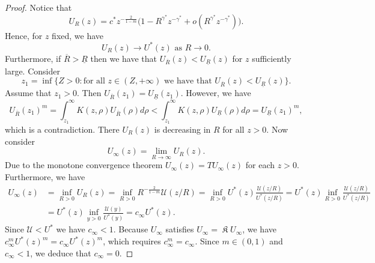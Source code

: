 \documentclass[a4paper]{article}
\theoremstyle{definition}
\DeclareMathOperator{\fixedpoint}{\mathfrak K}
\begin{document}
\begin{proof}
Notice that
\[
  U_R(z) = c^*z^{-\frac 2{1-m}}\Big(1 - R^{\gamma^*} z^{-\gamma^*} + o\left(R^{\gamma^*} z^{-\gamma^*}\right)\Big).
\]
Hence, for $z$ fixed, we have
\[
  U_R(z) \to U^*(z) \text{ as } R \to 0.
\]
Furthermore, if $\overline R > \underline R$ then we have that
$U_{\overline R}(z) < U_{\underline R}(z)$ for $z$ sufficiently large. Consider
\begin{equation*}
  z_1 = \inf\{Z > 0 : \text{for all } z \in (Z,+\infty) \text{ we have that } U_{\overline R}(z) < U_{\underline R}(z)\}.
\end{equation*}
Assume that $z_1 > 0$. Then $U_{\overline R}(z_1) = U_{\underline R}(z_1)$. However, we have
\[
  U_{\overline R}(z_1)^m  = \int_{z_1}^\infty K(z,\rho) U_{\overline R}(\rho) d\rho < \int_{z_1}^\infty K(z,\rho) U_{\underline R}(\rho) d\rho = U_{\underline R} (z_1)^m ,
\]
which is a contradiction. There $U_R(z)$ is decreasing in $R$ for all $z>0$. Now consider
\[
  U_\infty(z) = \lim_{R \to \infty} U_R (z).
\]
Due to the monotone convergence theorem $U_\infty(z) = T U_\infty(z)$ for each $z > 0$. Furthermore, we have
\begin{align*}
  U_\infty(z) & = \inf_{R > 0} U_R(z) = \inf_{R>0} R^{-\frac{2}{1-m}} \mathcal U(z/R) =  \inf_{R>0} U^*(z) \frac{\mathcal U(z/R)}{U^*(z/R)} = U^*(z) \inf_{R>0} \frac{\mathcal U(z/R)}{U^*(z/R)} \\
  & = U^*(z) \inf_{y > 0} \frac{\mathcal U(y)}{U^*(y)} = c_\infty U^*(z).
\end{align*}
Since $\mathcal U < U^*$ we have $c_\infty < 1$. Because $U_\infty$ satisfies $U_\infty = \fixedpoint U_\infty$, we have $c_\infty^m U^*(z)^m = c_\infty U^*(z)^m$, which requires $c_\infty^m = c_\infty$. Since $m \in (0,1)$ and $c_\infty < 1$, we deduce that $c_\infty = 0$.\normalcolor
\end{proof}
\end{document}
